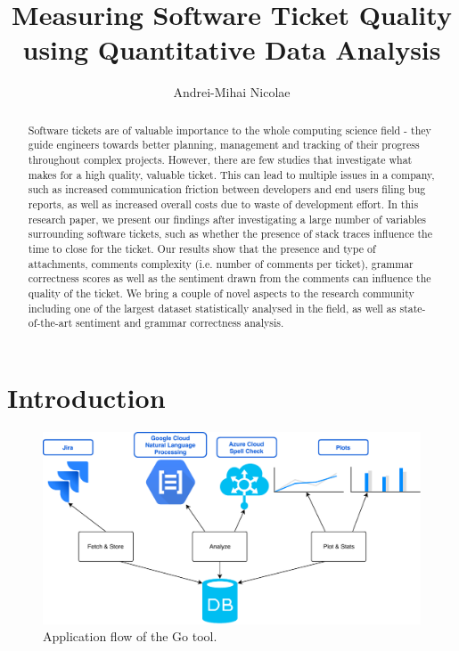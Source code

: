 \documentclass{mpaper}
\begin{document}
\title{Measuring Software Ticket Quality using Quantitative Data Analysis}
\author{Andrei-Mihai Nicolae}

\maketitle

\begin{abstract}
Software tickets are of valuable importance to the whole computing science 
field - they guide engineers towards better planning, management 
and tracking of their progress throughout complex projects. However, there
are few studies that investigate what makes for a high quality,
valuable ticket. This can lead to multiple issues in a company, such as 
increased communication friction between developers and end users filing bug
reports, as well as increased overall costs due to waste of development effort. 
In this research paper, we present our findings after 
investigating a large number of variables surrounding software tickets, 
such as whether the presence of stack traces influence the time 
to close for the ticket. Our results show that the presence and type of attachments,
comments complexity (i.e. number of comments per ticket), grammar correctness scores
as well as the sentiment drawn from the comments can influence the quality of the ticket.
We bring a couple of novel aspects to the research
community including one of the largest dataset statistically analysed in the field,
as well as state-of-the-art sentiment and grammar correctness analysis.
\end{abstract}

\section{Introduction}

\begin{figure}
\begin{center}
\includegraphics[width=\textwidth]{images/flow.pdf}
\end{center}
\caption{\label{fig-eg}Application flow of the Go tool.}
\end{figure}
\end{document}
